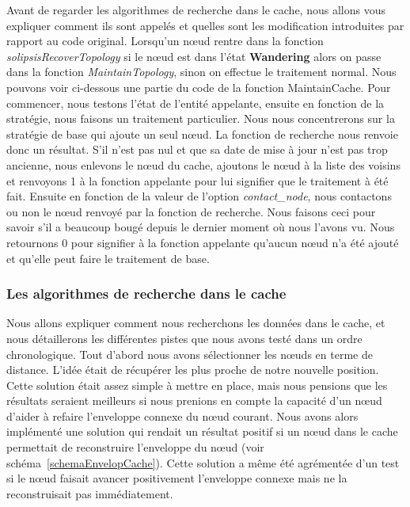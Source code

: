  Avant de regarder les algorithmes de recherche dans le cache, nous allons vous expliquer comment ils sont appelés et quelles sont les modification introduites par rapport au code original. Lorsqu'un nœud rentre dans la fonction \textit{solipsisRecoverTopology} si le nœud est dans l'état \textbf{Wandering} alors on passe dans la fonction \textit{MaintainTopology}, sinon on effectue le traitement normal. Nous pouvons voir ci-dessous une partie du code de la fonction MaintainCache. Pour commencer, nous testons l'état de l'entité appelante, ensuite en fonction de la stratégie, nous faisons un traitement particulier. Nous nous concentrerons sur la stratégie de base qui ajoute un seul nœud. La fonction de recherche nous renvoie donc un résultat. S'il n'est pas nul et que sa date de mise à jour n'est pas trop ancienne, nous enlevons le nœud du cache, ajoutons le nœud à la liste des voisins et renvoyons 1 à la fonction appelante pour lui signifier que le traitement à été fait. Ensuite en fonction de la valeur de l'option \textit{contact\_node}, nous contactons ou non le nœud renvoyé par la fonction de recherche. Nous faisons ceci pour savoir s'il a beaucoup bougé depuis le dernier moment où nous l'avons vu. Nous retournons 0 pour signifier à la fonction appelante qu'aucun nœud n'a été ajouté et qu'elle peut faire le traitement de base.

\lstset{numbers=left,basicstyle=\scriptsize, numberstyle=\tiny, stepnumber=5, numbersep=5pt}





\subsubsection{Les algorithmes de recherche dans le cache}
\par Nous allons expliquer comment nous recherchons les données dans le cache, et nous détaillerons les différentes pistes que nous avons testé dans un ordre chronologique. Tout d'abord nous avons sélectionner les nœuds en terme de distance. L'idée  était de récupérer les plus proche de notre nouvelle position. Cette solution était assez simple à mettre en place, mais nous pensions que les résultats seraient meilleurs si nous prenions en compte la capacité d'un nœud d'aider à refaire l'enveloppe connexe du nœud courant. Nous avons alors implémenté une solution qui rendait un résultat positif si un nœud dans le cache permettait de reconstruire l'enveloppe du nœud (voir schéma~\ref{schemaEnvelopCache}). Cette solution a même été agrémentée d'un test si le nœud faisait avancer positivement l'enveloppe connexe mais ne la reconstruisait pas immédiatement.

